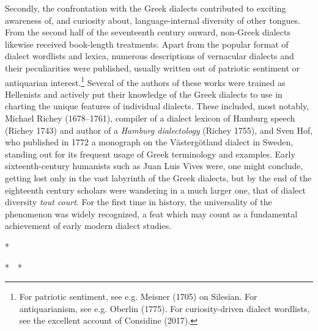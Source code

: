 \begin{styleStandard}
Secondly, the confrontation with the Greek dialects contributed to exciting awareness of, and curiosity about, language-internal diversity of other tongues. From the second half of the seventeenth century onward, non-Greek dialects likewise received book-length treatments. Apart from the popular format of dialect wordlists and lexica, numerous descriptions of vernacular dialects and their peculiarities were published, usually written out of patriotic sentiment or antiquarian interest.\footnote{ For patriotic sentiment, see e.g. Meisner (1705) on Silesian. For antiquarianism, see e.g. Oberlin (1775). For curiosity-driven dialect wordlists, see the excellent account of Considine (2017).} Several of the authors of these works were trained as Hellenists and actively put their knowledge of the Greek dialects to use in charting the unique features of individual dialects. These included, most notably, Michael Richey (1678–1761), compiler of a dialect lexicon of Hamburg speech (Richey 1743) and author of a \textit{Hamburg dialectology} (Richey 1755), and Sven Hof, who published in 1772 a monograph on the Västergötland dialect in Sweden, standing out for its frequent usage of Greek terminology and examples. Early sixteenth-century humanists such as Juan Luis Vives were, one might conclude, getting lost only in the vast labyrinth of the Greek dialects, but by the end of the eighteenth century scholars were wandering in a much larger one, that of dialect diversity \textit{tout court}. For the first time in history, the universality of the phenomenon was widely recognized, a feat which may count as a fundamental achievement of early modern dialect studies.
\end{styleStandard}

\begin{styleStandard}
*
\end{styleStandard}

\begin{styleStandard}
*\ \ *
\end{styleStandard}

